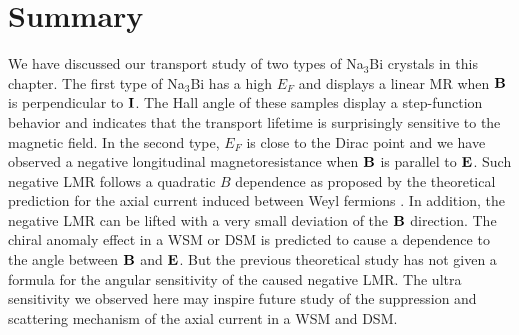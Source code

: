 \section{Summary}
\label{sec:na3bi:summary}


We have discussed our transport study of two types of Na$_3$Bi crystals in this chapter. The first type of Na$_3$Bi has a high $E_F$ and displays a linear MR when $\bf B$ is perpendicular to $\bf I$. The Hall angle of these samples display a step-function behavior and indicates that the transport lifetime is surprisingly sensitive to the magnetic field. In the second type, $E_F$ is close to the Dirac point and we have observed a negative longitudinal magnetoresistance when $\bf B$ is parallel to $\bf E$. Such negative LMR follows a quadratic $B$ dependence as proposed by the theoretical prediction for the axial current induced between Weyl fermions \cite{Son2013}. In addition, the negative LMR can be lifted with a very small deviation of the $\bf B$ direction. The chiral anomaly effect in a WSM or DSM is predicted to cause a dependence to the angle between $\bf B$ and $\bf E$. But the previous theoretical study has not given a formula for the angular sensitivity of the caused negative LMR. The ultra sensitivity we observed here may inspire future study of the suppression and scattering mechanism of the axial current in a WSM and DSM.